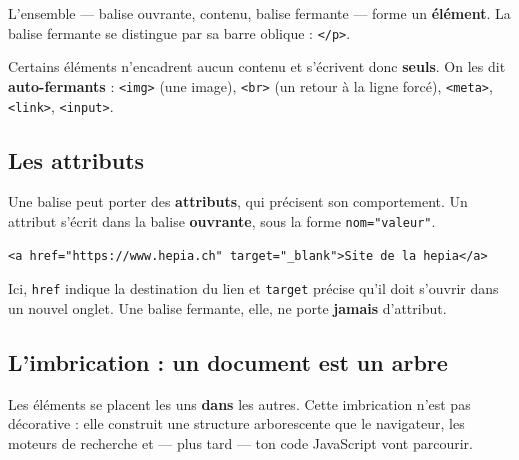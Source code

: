 \documentclass[a4paper,11pt]{article}
\begin{document}
L'ensemble --- balise ouvrante, contenu, balise fermante --- forme un \textbf{élément}. La balise fermante se distingue par sa barre oblique : \texttt{</p>}.

\vspace{4pt}
Certains éléments n'encadrent aucun contenu et s'écrivent donc \textbf{seuls}. On les dit \textbf{auto-fermants} : \texttt{<img>} (une image), \texttt{<br>} (un retour à la ligne forcé), \texttt{<meta>}, \texttt{<link>}, \texttt{<input>}.

\subsection{Les attributs}

Une balise peut porter des \textbf{attributs}, qui précisent son comportement. Un attribut s'écrit dans la balise \textbf{ouvrante}, sous la forme \texttt{nom="valeur"}.

\begin{lstlisting}[language=HTML5, caption={Une balise, deux attributs}]
<a href="https://www.hepia.ch" target="_blank">Site de la hepia</a>
\end{lstlisting}

Ici, \texttt{href} indique la destination du lien et \texttt{target} précise qu'il doit s'ouvrir dans un nouvel onglet. Une balise fermante, elle, ne porte \textbf{jamais} d'attribut.

\subsection{L'imbrication : un document est un arbre}

Les éléments se placent les uns \textbf{dans} les autres. Cette imbrication n'est pas décorative : elle construit une structure arborescente que le navigateur, les moteurs de recherche et --- plus tard --- ton code JavaScript vont parcourir.

\vspace{8pt}
\begin{center}
\end{center}
\vspace{2pt}
\end{document}
